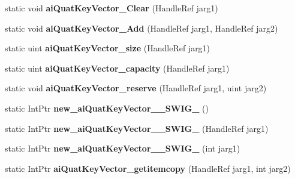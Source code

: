 \begin{DoxyCompactItemize}
\item 
\hypertarget{class_assimp_p_i_n_v_o_k_e_aace3c4ff0927db705c2e5aeae13d7491}{static void {\bfseries ai\+Quat\+Key\+Vector\+\_\+\+Clear} (Handle\+Ref jarg1)}\label{class_assimp_p_i_n_v_o_k_e_aace3c4ff0927db705c2e5aeae13d7491}

\item 
\hypertarget{class_assimp_p_i_n_v_o_k_e_a6b116bbdda59103a4feb5015060b32e0}{static void {\bfseries ai\+Quat\+Key\+Vector\+\_\+\+Add} (Handle\+Ref jarg1, Handle\+Ref jarg2)}\label{class_assimp_p_i_n_v_o_k_e_a6b116bbdda59103a4feb5015060b32e0}

\item 
\hypertarget{class_assimp_p_i_n_v_o_k_e_a1364b827e099707de40073e31b12ceda}{static uint {\bfseries ai\+Quat\+Key\+Vector\+\_\+size} (Handle\+Ref jarg1)}\label{class_assimp_p_i_n_v_o_k_e_a1364b827e099707de40073e31b12ceda}

\item 
\hypertarget{class_assimp_p_i_n_v_o_k_e_add15f7a811ed757d18556b07c878d5ed}{static uint {\bfseries ai\+Quat\+Key\+Vector\+\_\+capacity} (Handle\+Ref jarg1)}\label{class_assimp_p_i_n_v_o_k_e_add15f7a811ed757d18556b07c878d5ed}

\item 
\hypertarget{class_assimp_p_i_n_v_o_k_e_a2c8fbcbdde84c12ee94d0bce8a4b4e4a}{static void {\bfseries ai\+Quat\+Key\+Vector\+\_\+reserve} (Handle\+Ref jarg1, uint jarg2)}\label{class_assimp_p_i_n_v_o_k_e_a2c8fbcbdde84c12ee94d0bce8a4b4e4a}

\item 
\hypertarget{class_assimp_p_i_n_v_o_k_e_af94ccddcceb3d36718d59b4afd301cec}{static Int\+Ptr {\bfseries new\+\_\+ai\+Quat\+Key\+Vector\+\_\+\+\_\+\+S\+W\+I\+G\+\_} ()}\label{class_assimp_p_i_n_v_o_k_e_af94ccddcceb3d36718d59b4afd301cec}

\item 
\hypertarget{class_assimp_p_i_n_v_o_k_e_a84670a8cd486e3db40d6c2cb5f607989}{static Int\+Ptr {\bfseries new\+\_\+ai\+Quat\+Key\+Vector\+\_\+\+\_\+\+S\+W\+I\+G\+\_} (Handle\+Ref jarg1)}\label{class_assimp_p_i_n_v_o_k_e_a84670a8cd486e3db40d6c2cb5f607989}

\item 
\hypertarget{class_assimp_p_i_n_v_o_k_e_aa06809f0cec511bfd19a89242457a702}{static Int\+Ptr {\bfseries new\+\_\+ai\+Quat\+Key\+Vector\+\_\+\+\_\+\+S\+W\+I\+G\+\_} (int jarg1)}\label{class_assimp_p_i_n_v_o_k_e_aa06809f0cec511bfd19a89242457a702}

\item 
\hypertarget{class_assimp_p_i_n_v_o_k_e_a4de9fe46eb51688e74edca5a3ab257d0}{static Int\+Ptr {\bfseries ai\+Quat\+Key\+Vector\+\_\+getitemcopy} (Handle\+Ref jarg1, int jarg2)}\label{class_assimp_p_i_n_v_o_k_e_a4de9fe46eb51688e74edca5a3ab257d0}


\end{DoxyCompactItemize}
